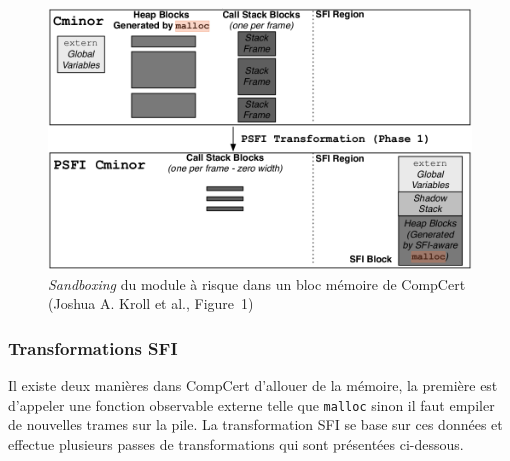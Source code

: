 \documentclass[11pt]{sdm}
\begin{document}
\begin{figure}
\centering
\includegraphics[scale=0.36]{images/psfi.png}
\caption{\textit{Sandboxing} du module à risque dans un bloc mémoire de CompCert (Joshua A. Kroll et al., Figure~1)}
\label{psfi}
\end{figure}

\subsubsection{Transformations SFI}

Il existe deux manières dans CompCert d'allouer de la mémoire, la première est d'appeler une fonction observable externe telle que \texttt{malloc} sinon il faut empiler de nouvelles trames sur la pile.
La transformation SFI se base sur ces données et effectue plusieurs passes de transformations qui sont présentées ci-dessous.
\end{document}
